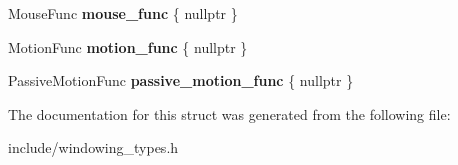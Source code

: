 \begin{DoxyCompactItemize}
Mouse\+Func {\bfseries mouse\+\_\+func} \{ nullptr \}
\item 
\mbox{\label{struct_blade_1_1_window_function_callbacks_aa52fead06f63b701bfbce90de2403ec9}} 
Motion\+Func {\bfseries motion\+\_\+func} \{ nullptr \}
\item 
\mbox{\label{struct_blade_1_1_window_function_callbacks_aa471c65ce470b6c273e4868908cb8b48}} 
Passive\+Motion\+Func {\bfseries passive\+\_\+motion\+\_\+func} \{ nullptr \}
\end{DoxyCompactItemize}


The documentation for this struct was generated from the following file\+:\begin{DoxyCompactItemize}
\item 
include/windowing\+\_\+types.\+h\end{DoxyCompactItemize}
